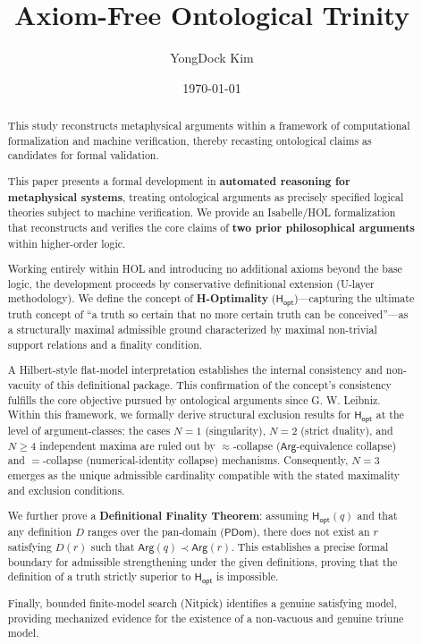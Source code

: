 \documentclass[a4paper, 11pt]{article}
\title{\textbf{Axiom-Free Ontological Trinity}}
\author{YongDock Kim}
\date{\today}
\theoremstyle{plain}
\theoremstyle{definition}
\newcommand{\Arg}{\mathsf{Arg}}           %
\newcommand{\Hopt}{\mathsf{H_{opt}}}       %
\newcommand{\PDom}{\mathsf{PDom}}         %
\begin{document}
\maketitle

\begin{abstract}
This study reconstructs metaphysical arguments within a framework of computational formalization and machine verification, thereby recasting ontological claims as candidates for formal validation.

This paper presents a formal development in \textbf{automated reasoning for metaphysical systems}, treating ontological arguments as precisely specified logical theories subject to machine verification. We provide an Isabelle/HOL formalization that reconstructs and verifies the core claims of \textbf{two prior philosophical arguments} within higher-order logic.

Working entirely within HOL and introducing no additional axioms beyond the base logic, the development proceeds by conservative definitional extension (U-layer methodology). We define the concept of \textbf{H-Optimality} ($\Hopt$)---capturing the ultimate truth concept of ``a truth so certain that no more certain truth can be conceived''---as a structurally maximal admissible ground characterized by maximal non-trivial support relations and a finality condition.

A Hilbert-style flat-model interpretation establishes the internal consistency and non-vacuity of this definitional package. This confirmation of the concept's consistency fulfills the core objective pursued by ontological arguments since G. W. Leibniz. Within this framework, we formally derive structural exclusion results for $\Hopt$ at the level of argument-classes: the cases $N=1$ (singularity), $N=2$ (strict duality), and $N \ge 4$ independent maxima are ruled out by $\approx$-collapse ($\Arg$-equivalence collapse) and $=$-collapse (numerical-identity collapse) mechanisms. Consequently, $N=3$ emerges as the unique admissible cardinality compatible with the stated maximality and exclusion conditions.

We further prove a \textbf{Definitional Finality Theorem}: assuming $\Hopt(q)$ and that any definition $D$ ranges over the pan-domain ($\PDom$), there does not exist an $r$ satisfying $D(r)$ such that $\Arg(q) \prec \Arg(r)$. This establishes a precise formal boundary for admissible strengthening under the given definitions, proving that the definition of a truth strictly superior to $\Hopt$ is impossible.

Finally, bounded finite-model search (Nitpick) identifies a genuine satisfying model, providing mechanized evidence for the existence of a non-vacuous and genuine triune model.
\end{abstract}
\end{document}

